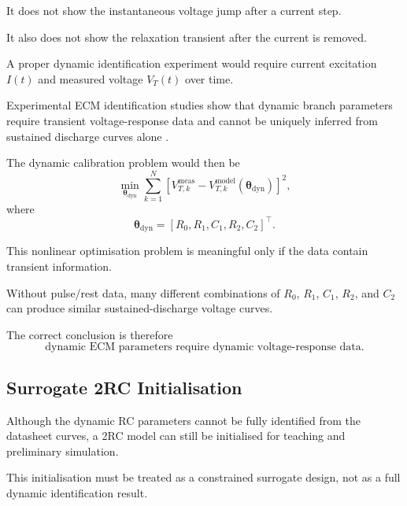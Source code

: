 \documentclass[a4paper,12pt]{article}
\newcommand{\vect}[1]{\bm{#1}}
\begin{document}
It does not show the instantaneous voltage jump after a current step.

It also does not show the relaxation transient after the current is removed.

A proper dynamic identification experiment would require current excitation \(I(t)\) and measured voltage \(V_T(t)\) over time.

Experimental ECM identification studies show that dynamic branch parameters require transient voltage-response data and cannot be uniquely inferred from sustained discharge curves alone \cite{he_xiong_fan_2011,einhorn_conte_kral_fleig_2011,plett_bms_vol2}.

The dynamic calibration problem would then be
\begin{equation}
\min_{\vect{\theta}_{\mathrm{dyn}}}
\sum_{k=1}^{N}
\left[
V_{T,k}^{\mathrm{meas}}
-
V_{T,k}^{\mathrm{model}}
\left(
\vect{\theta}_{\mathrm{dyn}}
\right)
\right]^2,
\label{eq:method_dynamic_identification_problem}
\end{equation}
where
\begin{equation}
\vect{\theta}_{\mathrm{dyn}}
=
\left[
R_0,
R_1,
C_1,
R_2,
C_2
\right]^{\top}.
\label{eq:method_dynamic_theta}
\end{equation}

This nonlinear optimisation problem is meaningful only if the data contain transient information.

Without pulse/rest data, many different combinations of \(R_0\), \(R_1\), \(C_1\), \(R_2\), and \(C_2\) can produce similar sustained-discharge voltage curves.

The correct conclusion is therefore
\begin{equation}
\boxed{
\text{dynamic ECM parameters require dynamic voltage-response data.}
}
\label{eq:method_dynamic_data_requirement}
\end{equation}

\subsection{Surrogate 2RC Initialisation}

Although the dynamic RC parameters cannot be fully identified from the datasheet curves, a 2RC model can still be initialised for teaching and preliminary simulation.

This initialisation must be treated as a constrained surrogate design, not as a full dynamic identification result.
\end{document}
